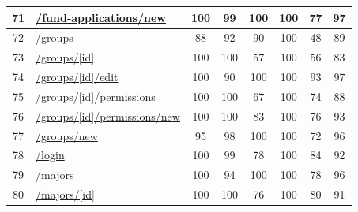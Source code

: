 \begin{longtable}{|c|p{5cm}|c|c|c|c|c|c|}
      \hline
      71                                       & \url{/fund-applications/new}                               & 100              & 99               & 100              & 100              & 77               & 97            \\
      \hline
      72                                       & \url{/groups}                                              & 88               & 92               & 90               & 100              & 48               & 89            \\
      \hline
      73                                       & \url{/groups/[id]}                                         & 100              & 100              & 57               & 100              & 56               & 83            \\
      \hline
      74                                       & \url{/groups/[id]/edit}                                    & 100              & 90               & 100              & 100              & 93               & 97            \\
      \hline
      75                                       & \url{/groups/[id]/permissions}                             & 100              & 100              & 67               & 100              & 74               & 88            \\
      \hline
      76                                       & \url{/groups/[id]/permissions/new}                         & 100              & 100              & 83               & 100              & 76               & 93            \\
      \hline
      77                                       & \url{/groups/new}                                          & 95               & 98               & 100              & 100              & 72               & 96            \\
      \hline
      78                                       & \url{/login}                                               & 100              & 99               & 78               & 100              & 84               & 92            \\
      \hline
      79                                       & \url{/majors}                                              & 100              & 94               & 100              & 100              & 78               & 96            \\
      \hline
      80                                       & \url{/majors/[id]}                                         & 100              & 100              & 76               & 100              & 80               & 91            \\

\end{longtable}

